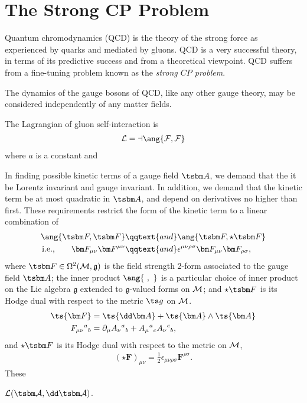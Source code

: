 \chapter{The Strong CP Problem}

Quantum chromodynamics (QCD) is the theory of the strong force as experienced by quarks and mediated by gluons.
QCD is a very successful theory, in terms of its predictive success and from a theoretical viewpoint. 
QCD suffers from a fine-tuning problem known as the \emph{strong $CP$ problem}.


The dynamics of the gauge bosons of QCD, like any other gauge theory, may be considered independently of any matter fields.

The Lagrangian of gluon self-interaction is
\begin{align}
	\cal L = a\ang{F,F}
\end{align}
where $a$ is a constant and 


In finding possible kinetic terms of a gauge field $\tsbm A$, we demand that the it be Lorentz invariant and gauge invariant.
In addition, we demand that the kinetic term be at most quadratic in $\tsbm A$, and depend on derivatives no higher than first.
These requirements restrict the form of the kinetic term to a linear combination of
\begin{align}
	\ang{\tsbm F, \tsbm F}
	&\qqtext{and}
	\ang{\tsbm F, \star\tsbm F}
\\	\text{i.e.,}\qquad
	\bm F_{\mu\nu}\bm F^{\mu\nu}
	&\qqtext{and}
	\epsilon^{\mu\nu\rho\sigma}\bm F_{\mu\nu}\bm F_{\rho\sigma}
,\end{align}
where $\tsbm F \in \Omega^2(\cal M, \mathfrak g)$ is the field strength 2-form associated to the gauge field $\tsbm A$;
the inner product $\ang{\ ,\ }$ is a particular choice of inner product on the Lie algebra $\mathfrak g$ extended to $\mathfrak g$-valued forms on $\cal M$;
and $\star\tsbm F$ is its Hodge dual with respect to the metric $\ts g$ on $\cal M$.
\begin{align}
	\ts{\bm F} &= \ts{\dd\bm A} + \ts{\bm A} \wedge \ts{\bm A}
\\ F_{\mu\nu}{}^a{}_b &= \partial_\mu A_\nu{}^a{}_b +  A_\mu{}^a{}_c A_\nu{}^c{}_b
,\end{align}
and $\star\tsbm F$ is its Hodge dual with respect to the metric on $\cal M$,
\begin{align}
	(\star\bm F)_{\mu\nu} = \frac12 \epsilon_{\mu\nu\rho\sigma}\bm F^{\rho\sigma}
.\end{align}
These

$\cal L(\tsbm A, \dd\tsbm A)$.

